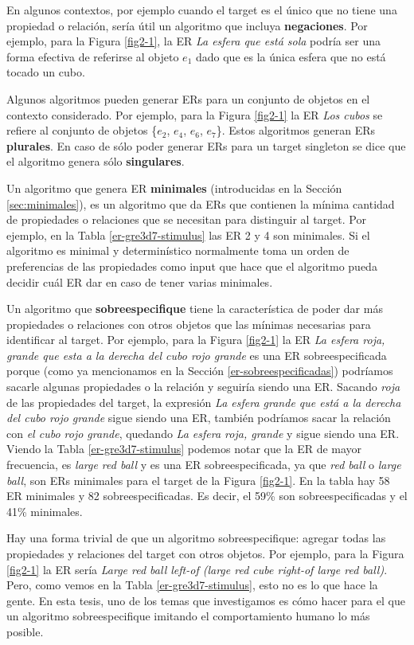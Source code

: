 En algunos contextos, por ejemplo cuando el target es el \'unico que no tiene una propiedad o relaci\'on, ser\'ia \'util un algoritmo que incluya {\bf negaciones}. Por ejemplo, para la Figura \ref{fig2-1}, la ER {\it La esfera que est\'a sola} podr\'ia ser 
una forma efectiva de referirse al objeto $e_1$ dado que es la \'unica esfera que no est\'a tocado un cubo.

Algunos algoritmos pueden generar ERs para un conjunto de objetos en el contexto considerado. Por ejemplo, para la Figura \ref{fig2-1} la ER {\it Los cubos} se refiere  al conjunto de objetos \{$e_2$, $e_4$, $e_6$, $e_7$\}. Estos algoritmos generan ERs {\bf plurales}. En caso de s\'olo poder generar ERs para un target singleton se dice que el algoritmo genera s\'olo {\bf singulares}.

Un algoritmo que genera ER {\bf minimales} (introducidas en la Secci\'on \ref{sec:minimales}), es un algoritmo que da ERs que contienen la m\'inima cantidad de propiedades o relaciones que se necesitan para distinguir al target. Por ejemplo, en la Tabla \ref{er-gre3d7-stimulus} las ER 2 y 4 son minimales. Si el algoritmo es minimal y determin\'istico normalmente toma un orden de preferencias de las propiedades como input que hace que el algoritmo pueda decidir cu\'al ER dar en caso de tener varias minimales.

Un algoritmo que {\bf sobreespecifique} tiene la caracter\'istica de poder dar m\'as propiedades o relaciones con otros objetos que las m\'inimas necesarias para identificar al target. Por ejemplo, para la Figura \ref{fig2-1} la ER {\it La esfera roja, grande que esta a la derecha del cubo rojo grande} es una ER sobreespecificada porque (como ya mencionamos en la Secci\'on \ref{er-sobreespecificadas}) podr\'iamos sacarle algunas propiedades o la relaci\'on y seguir\'ia siendo una ER. Sacando {\it roja} de las propiedades del target, la expresi\'on {\it La esfera grande que est\'a a la derecha del cubo rojo grande} sigue siendo una ER, tambi\'en podr\'iamos sacar la relaci\'on con {\it el cubo rojo grande}, quedando {\it La esfera roja, grande} y sigue siendo una ER. Viendo la Tabla \ref{er-gre3d7-stimulus} podemos notar que la ER de mayor frecuencia, es {\it large red ball} y es una ER sobreespecificada, ya que {\it red ball} o {\it large ball}, son ERs minimales para el target de la Figura \ref{fig2-1}. En la tabla hay 58 ER minimales y 82 sobreespecificadas. Es decir, el 59\% son sobreespecificadas y el 41\% minimales.

Hay una forma trivial de que un algoritmo sobreespecifique: agregar todas las propiedades y relaciones del target con otros objetos. Por ejemplo, para la Figura \ref{fig2-1} la ER ser\'ia {\it Large red ball left-of (large red cube right-of large red ball)}. Pero, como vemos en la Tabla \ref{er-gre3d7-stimulus}, esto no es lo que hace la gente. En esta tesis, uno de los temas que investigamos es c\'omo hacer para el que un algoritmo sobreespecifique imitando el comportamiento humano lo m\'as posible. 

